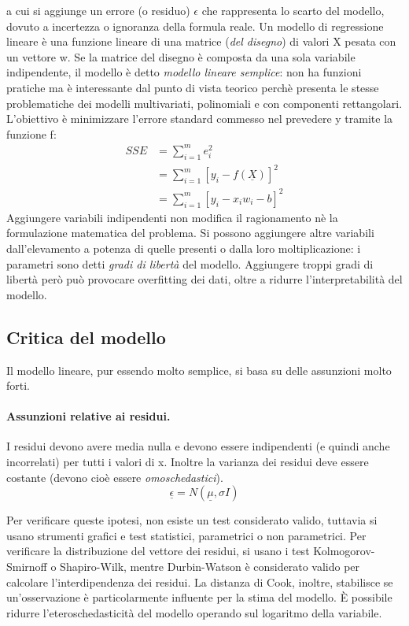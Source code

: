 \documentclass[11pt, a4page, twocolumn]{article}
\begin{document}
a cui si aggiunge un errore (o residuo) $\epsilon$ che rappresenta lo scarto del modello, dovuto a incertezza o ignoranza della formula reale. \newline
Un modello di regressione lineare è una funzione lineare di una matrice (\textit{del disegno}) di valori X pesata con un vettore w.
Se la matrice del disegno è composta da una sola variabile indipendente, il modello è detto \textit{modello lineare semplice}: non ha funzioni pratiche ma è interessante dal punto di vista teorico perchè presenta le stesse problematiche dei modelli multivariati, polinomiali e con componenti rettangolari. \newline
L'obiettivo è minimizzare l'errore standard commesso nel prevedere y tramite la funzione f:
\begin{align*}
  SSE &= \sum^m_{i=1}{e^2_i} \\
      &= \sum^m_{i=1}{[y_i -f(\underline{X})]^2} \\
      &= \sum^m_{i=1}{[y_i -x_iw_i - b]^2}
\end{align*}
Aggiungere variabili indipendenti non modifica il ragionamento nè la formulazione matematica del problema.
Si possono aggiungere altre variabili dall'elevamento a potenza di quelle presenti o dalla loro moltiplicazione: i parametri sono detti \textit{gradi di libertà} del modello.
Aggiungere troppi gradi di libertà però può provocare overfitting dei dati, oltre a ridurre l'interpretabilità del modello.

\subsection{Critica del modello}
Il modello lineare, pur essendo molto semplice, si basa su delle assunzioni molto forti.\newline

\paragraph{Assunzioni relative ai residui.}
I residui devono avere media nulla e devono essere indipendenti (e quindi anche incorrelati) per tutti i valori di x.
Inoltre la varianza dei residui deve essere costante (devono cioè essere \textit{omoschedastici}).
\begin{equation*}
  \underline{\epsilon} = N(\underline{\mu}, \sigma{}I)
\end{equation*}

Per verificare queste ipotesi, non esiste un test considerato valido, tuttavia si usano strumenti grafici e test statistici, parametrici o non parametrici. \newline
Per verificare la distribuzione del vettore dei residui, si usano i test Kolmogorov-Smirnoff o Shapiro-Wilk, mentre Durbin-Watson è considerato valido per calcolare l'interdipendenza dei residui.
La distanza di Cook, inoltre, stabilisce se un'osservazione è particolarmente influente per la stima del modello. \newline
È possibile ridurre l'eteroschedasticità del modello operando sul logaritmo della variabile. \newline
\end{document}
